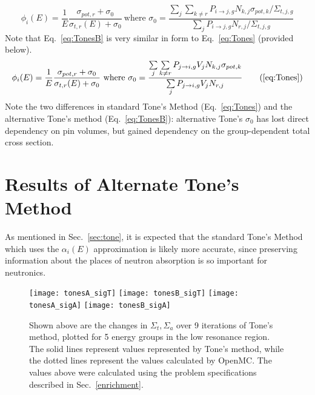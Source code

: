 \documentclass[10pt]{article}
\begin{document}
  \begin{equation}\phi_i(E)=\frac{1}{E}\frac{\sigma_{pot,r}+\sigma_{0}}{\sigma_{t,r}(E)+\sigma_{0}}~\mbox{where }\sigma_{0}=\frac{\sum\limits_j\sum\limits_{k\neq r}P_{i\rightarrow j,g}N_{k,j}\sigma_{pot,k}\Big/\Sigma_{t,j,g} }{\sum\limits_jP_{i\rightarrow j,g}N_{r,j}\Big/\Sigma_{t,j,g}}\label{eq:TonesB}\end{equation}
Note that Eq.~\ref{eq:TonesB} is very similar in form to Eq.~\ref{eq:Tones} (provided below). 
\begin{equation}\phi_i(E)=\frac{1}{E}\frac{\sigma_{pot,r}+\sigma_{0}}{\sigma_{t,r}(E)+\sigma_{0}}~\mbox{where }\sigma_{0}=\frac{\sum\limits_j\sum\limits_{k\neq r}P_{j\rightarrow i,g}V_{j}N_{k,j}\sigma_{pot,k}}{\sum\limits_jP_{j\rightarrow i,g}V_{j}N_{r,j}}\tag{\ref{eq:Tones}}\end{equation}
  Note the two differences in standard Tone's Method (Eq.~\ref{eq:Tones}) and the alternative Tone's method (Eq.~\ref{eq:TonesB}): alternative Tone's $\sigma_0$ has lost direct dependency on pin volumes, but gained dependency on the group-dependent total cross section. 



\section{Results of Alternate Tone's Method}\label{sec:altResults}

As mentioned in Sec.~\ref{sec:tone}, it is expected that the standard Tone's Method which uses the $\alpha_i(E)$ approximation is likely more accurate, since preserving information about the places of neutron absorption is so important for neutronics.

  \begin{figure}[H]
    \begin{center}
    \texttt{[image: tonesA\_sigT]}
    \texttt{[image: tonesB\_sigT]}
    \texttt{[image: tonesA\_sigA]}
    \texttt{[image: tonesB\_sigA]}

      \caption{Shown above are the changes in $\Sigma_t,\Sigma_a$ over 9 iterations of Tone's method, plotted for 5 energy groups in the low resonance region. The solid lines represent values represented by Tone's method, while the dotted lines represent the values calculated by OpenMC. The values above were calculated using the problem specifications described in Sec.~\ref{enrichment}.}
      \label{fig:results3}
    \end{center}
  \end{figure}
\end{document}
